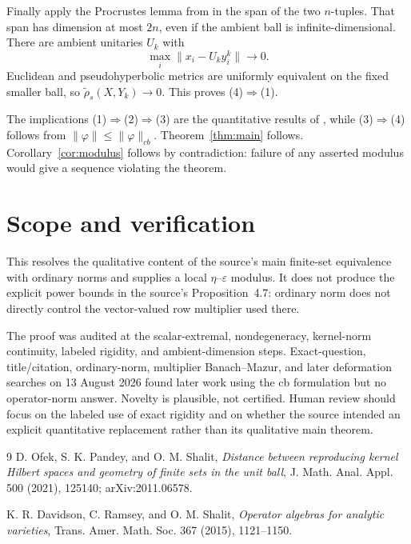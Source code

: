 \documentclass[11pt]{article}
\begin{document}
Finally apply the Procrustes lemma from \cite{OPS} in the span of the two
$n$-tuples.  That span has dimension at most $2n$, even if the ambient ball
is infinite-dimensional.  There are ambient unitaries $U_k$ with
\[
 \max_i\|x_i-U_ky_i^k\|\longrightarrow0.
\]
Euclidean and pseudohyperbolic metrics are uniformly equivalent on the fixed
smaller ball, so $\widetilde\rho_s(X,Y_k)\to0$.  This proves (4)$\Rightarrow$(1).

The implications (1)$\Rightarrow$(2)$\Rightarrow$(3) are the quantitative
results of \cite{OPS}, while (3)$\Rightarrow$(4) follows from
$\|\varphi\|\le\|\varphi\|_{cb}$.  Theorem~\ref{thm:main} follows.
Corollary~\ref{cor:modulus} follows by contradiction: failure of any asserted
modulus would give a sequence violating the theorem.

\section{Scope and verification}

This resolves the qualitative content of the source's main finite-set
equivalence with ordinary norms and supplies a local $\eta$--$\varepsilon$
modulus.  It does not produce the explicit power bounds in the source's
Proposition~4.7: ordinary norm does not directly control the vector-valued
row multiplier used there.

The proof was audited at the scalar-extremal, nondegeneracy, kernel-norm
continuity, labeled rigidity, and ambient-dimension steps.  Exact-question,
title/citation, ordinary-norm, multiplier Banach--Mazur, and later deformation
searches on 13 August 2026 found later work using the cb formulation but no
operator-norm answer.  Novelty is plausible, not certified.  Human review
should focus on the labeled use of exact rigidity and on whether the source
intended an explicit quantitative replacement rather than its qualitative
main theorem.

\begin{thebibliography}{9}
D. Ofek, S. K. Pandey, and O. M. Shalit,
\emph{Distance between reproducing kernel Hilbert spaces and geometry of
finite sets in the unit ball},
J. Math. Anal. Appl. 500 (2021), 125140; arXiv:2011.06578.

K. R. Davidson, C. Ramsey, and O. M. Shalit,
\emph{Operator algebras for analytic varieties},
Trans. Amer. Math. Soc. 367 (2015), 1121--1150.
\end{thebibliography}
\end{document}
